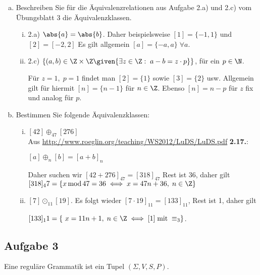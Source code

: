   \begin{enumerate}[a)]
    \item Beschreiben Sie für die Äquivalenzrelationen aus Aufgabe 2.a) und 2.c) vom Übungsblatt 3 die Äquivalenzklassen.
      \begin{enumerate}[i)]
        \item 2.a) $\abs{a} = \abs{b}$. Daher beispielsweise $[1] = \{-1, 1\}$ und $[2] = [-2, 2]$ Es gilt allgemein $[a] = \{ -a, a \} \; \forall a$.

        \item 2.c) $\{  (a,b) \in \Z \times \Z \given {\exists z \in \Z: \; a-b = z \cdot p}  \}$, für ein $p \in \N$.

        Für $z = 1, \; p=1$ findet man $[2] = \{1\}$ sowie $[3] = \{2\}$ usw. Allgemein gilt für hiermit $[n] = \{n-1\}$ für $n \in \Z$. Ebenso $[n] = n-p$ für $z$ fix und analog für $p$.


      \end{enumerate}


    \item Bestimmen Sie folgende Äquivalenzklassen:

    \begin{enumerate}[i)]
      \item $[42] \oplus_{47} [276]$\\
      Aus \url{http://www.roeglin.org/teaching/WS2012/LuDS/LuDS.pdf}{ \textbf{2.17.}}:

      \begin{definition}$[a] \oplus_{n} [b] = [a + b]_n$
      \end{definition}
      Daher suchen wir $[42 + 276]_47 = [318]_47$ Rest ist 36, daher gilt $[318]_47 = \{ x \, \text{mod} \, 47 = 36 \iff x = 47n + 36, \; n \in \Z  \} $

      \item $ [7] \odot_11 [19] $. Es folgt wieder $ [7 \cdot 19]_11 = [133]_11 $, Rest ist 1, daher gilt

      $ [133]_11 = \{\ x = 11n + 1, \; n \in \Z \iff [1] \; \text{mit} \; \equiv_{3} \} $.



    \end{enumerate}
  \end{enumerate}

  \subsection*{Aufgabe 3}
    Eine reguläre Grammatik ist ein Tupel $(\Sigma, V, S, P)$.

